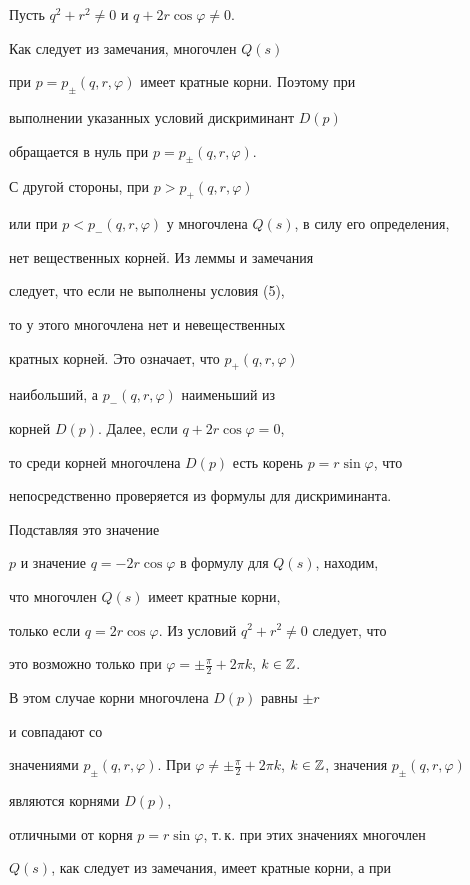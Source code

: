 \begin{pf}


Пусть $q^2+r^2 \ne 0$ и $q+2r\cos \varphi \ne 0$.


Как следует из замечания, многочлен $Q(s)$


при $p=p_\pm (q,r,\varphi)$ имеет кратные корни. Поэтому при


выполнении указанных условий дискриминант $D(p)$


обращается в нуль при $p=p_\pm (q,r,\varphi)$.


С другой стороны, при $p > p_+(q,r,\varphi)$


или при $p < p_- (q,r,\varphi)$ у многочлена $Q(s)$, в силу его определения,


нет вещественных корней. Из леммы и замечания


следует, что если не выполнены условия (5),


то у этого многочлена нет и невещественных


кратных корней. Это означает, что $p_+(q,r,\varphi)$


наибольший, а $p_- (q,r,\varphi)$ наименьший из


корней $D(p)$. Далее, если $q+2r\cos \varphi=0$,


то среди корней многочлена $D(p) $ есть корень $p=r \sin \varphi$, что


непосредственно проверяется из формулы для дискриминанта.


Подставляя это значение


$p$ и значение $q=- 2r\cos \varphi $ в формулу для $Q(s)$, находим,


что многочлен $Q(s)$ имеет кратные корни,


только если $q=2r\cos \varphi$. Из условий $q^2+r^2 \ne 0$ следует, что


это возможно только при $\varphi=\pm \frac{\pi}


{2}+2\pi k$, $k \in \Bbb Z$.


В этом случае корни многочлена $D(p)$ равны $\pm r$


и совпадают со


значениями $p_\pm (q,r,\varphi)$. При $\varphi \ne \pm \frac{\pi}


{2}+2\pi k$, $k \in \Bbb Z$, значения $p_\pm (q,r,\varphi)$


являются корнями $D(p)$,


отличными от корня $p=r \sin \varphi$, т.\,к. при этих значениях многочлен


$Q(s)$, как следует из замечания, имеет кратные корни, а при



\end{pf}
